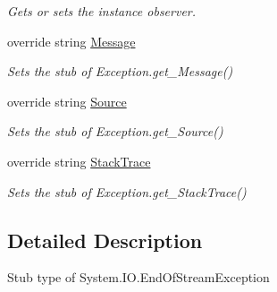 \begin{DoxyCompactItemize}
\begin{DoxyCompactList}\small\item\em Gets or sets the instance observer.\end{DoxyCompactList}\item 
override string \hyperlink{class_system_1_1_i_o_1_1_fakes_1_1_stub_end_of_stream_exception_aef5f6ab889327ba44081ad71b62dddab}{Message}
\begin{DoxyCompactList}\small\item\em Sets the stub of Exception.\-get\-\_\-\-Message()\end{DoxyCompactList}\item 
override string \hyperlink{class_system_1_1_i_o_1_1_fakes_1_1_stub_end_of_stream_exception_a346e51ee621b2a01c0fef91ebe0d21a0}{Source}
\begin{DoxyCompactList}\small\item\em Sets the stub of Exception.\-get\-\_\-\-Source()\end{DoxyCompactList}\item 
override string \hyperlink{class_system_1_1_i_o_1_1_fakes_1_1_stub_end_of_stream_exception_adcf9b975e3228ff7a1979f28ceff7ed4}{Stack\-Trace}
\begin{DoxyCompactList}\small\item\em Sets the stub of Exception.\-get\-\_\-\-Stack\-Trace()\end{DoxyCompactList}\end{DoxyCompactItemize}


\subsection{Detailed Description}
Stub type of System.\-I\-O.\-End\-Of\-Stream\-Exception



